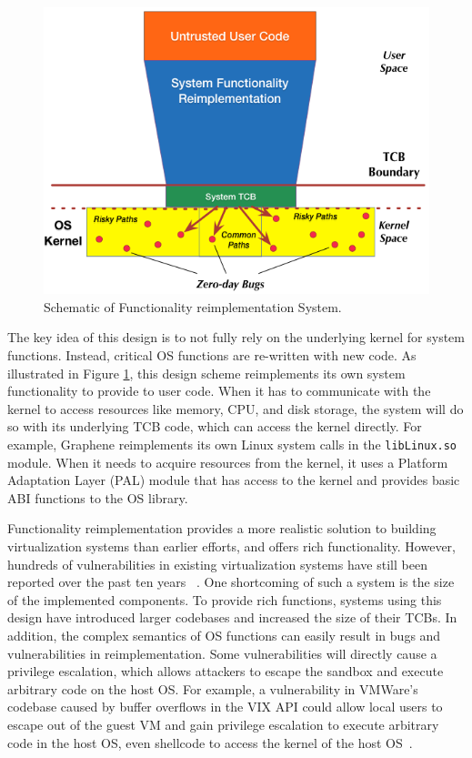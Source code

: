\begin{figure}%
\centering
\includegraphics[width=1.0\columnwidth]{diagram/Virtualization_Design_Model_02.png}
\caption{\small Schematic of Functionality reimplementation System.}
\label{fig:design_functionality_reimplementation}
\end{figure}

The key idea of this design is to not fully rely on the underlying
kernel for system functions. Instead, critical OS functions are re-written with new
code. As illustrated in Figure \ref{fig:design_functionality_reimplementation}, 
this design scheme reimplements its own system functionality to provide to user code. 
When it has to communicate with the kernel 
to access resources like memory, CPU, and disk storage, the system will do so with
its underlying TCB code, which can access the kernel directly.
For example, Graphene \cite{Graphene-14} reimplements
its own Linux system calls in the
\texttt{libLinux.so} module. When it needs to acquire resources from
the kernel, it uses a
Platform Adaptation Layer (PAL)  module that has access to the kernel
and provides basic ABI functions to the OS library.

Functionality reimplementation provides a more realistic solution to building
virtualization systems than earlier efforts, and offers rich functionality.
However, hundreds of vulnerabilities in existing virtualization systems have still been
reported over the past ten years ~\cite{NVD}. One shortcoming of such a system is the size
of the implemented components. To provide rich functions, systems using this design have
introduced larger codebases and increased the size of their TCBs. In addition, the
complex semantics of OS functions can easily result in bugs and vulnerabilities in
reimplementation. Some vulnerabilities
will directly cause a privilege escalation, which allows attackers to escape the sandbox
and execute arbitrary code on the host OS. 
For example, a vulnerability in VMWare's codebase caused by buffer overflows in the VIX
API could allow local users to escape out of the guest VM and 
gain privilege escalation to execute arbitrary code in the host
OS, even shellcode to access the kernel of the host OS~\cite{CVE-2008-2100}. 

